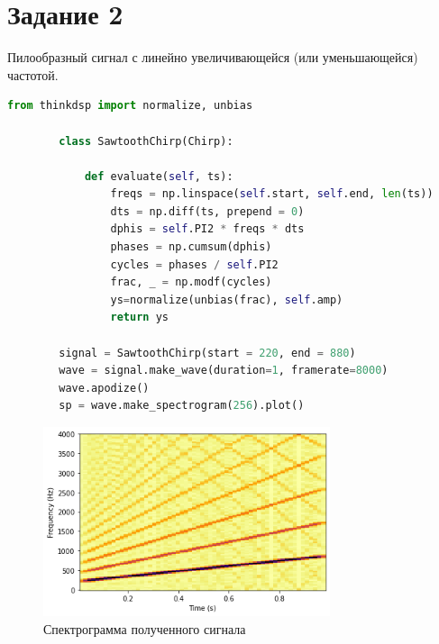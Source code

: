 \documentclass[a4paper, 12pt]{report}
\begin{document}
	\section{Задание 2}
	Пилообразный сигнал с линейно увеличивающейся (или уменьшающейся) частотой.
	\begin{lstlisting}[language=Python,caption=Создание нового класса]
		from thinkdsp import normalize, unbias

		class SawtoothChirp(Chirp):

			def evaluate(self, ts):
				freqs = np.linspace(self.start, self.end, len(ts))
				dts = np.diff(ts, prepend = 0)
				dphis = self.PI2 * freqs * dts
				phases = np.cumsum(dphis)
				cycles = phases / self.PI2
				frac, _ = np.modf(cycles)
				ys=normalize(unbias(frac), self.amp)
				return ys
		
		signal = SawtoothChirp(start = 220, end = 880)
		wave = signal.make_wave(duration=1, framerate=8000)
		wave.apodize()
		sp = wave.make_spectrogram(256).plot()
	\end{lstlisting}
	\begin{figure}[H]
		\centering
		\includegraphics[width=0.75\textwidth]{chirp5.png}
		\caption{Спектрограмма полученного сигнала}
		\label{fig:chirp5}
	\end{figure}
	
\end{document}
